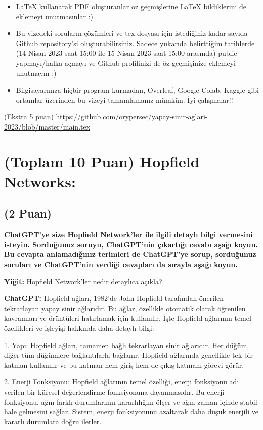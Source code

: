 \documentclass[11pt]{article}
\begin{document}
\begin{itemize}
    \item LaTeX kullanarak PDF oluşturanlar öz geçmişlerine LaTeX bildiklerini de eklemeyi unutmasınlar :)
    \item Bu vizedeki soruların çözümleri ve tex dosyası için istediğiniz kadar sayıda Github repository'si oluşturabilirsiniz. Sadece yukarıda belirttiğim tarihlerde (14 Nisan 2023 saat 15:00 ile 15 Nisan 2023 saat 15:00 arasında) public yapmayı/halka açmayı ve Github profilinizi de öz geçmişinize eklemeyi unutmayın :)
    \item Bilgisayarınıza hiçbir program kurmadan, Overleaf, Google Colab, Kaggle gibi ortamlar üzerinden bu vizeyi tamamlamanız mümkün. İyi çalışmalar!!
\end{itemize}

(Ekstra 5 puan) \url{https://github.com/orypersec/yapay-sinir-aglari-2023/blob/master/main.tex}

\newpage
\section{(Toplam 10 Puan) Hopfield Networks:}

\subsection{(2 Puan)} \textbf{ChatGPT’ye size Hopfield Network’ler ile ilgili detaylı bilgi vermesini isteyin. Sorduğunuz soruyu, ChatGPT'nin çıkartığı cevabı aşağı koyun. Bu cevapta anlamadığınız terimleri de ChatGPT’ye sorup, sorduğunuz soruları ve ChatGPT’nin verdiği cevapları da sırayla aşağı koyun.}

\textbf{Yiğit:} Hopfield Network’ler nedir detaylıca açıkla? 

\textbf{ChatGPT:} Hopfield ağları, 1982'de John Hopfield tarafından önerilen tekrarlayan yapay sinir ağlarıdır. Bu ağlar, özellikle otomatik olarak öğrenilen kavramları ve örüntüleri hatırlamak için kullanılır. İşte Hopfield ağlarının temel özellikleri ve işleyişi hakkında daha detaylı bilgi:

1. Yapı: Hopfield ağları, tamamen bağlı tekrarlayan sinir ağlarıdır. Her düğüm, diğer tüm düğümlere bağlantılarla bağlanır. Hopfield ağlarında genellikle tek bir katman kullanılır ve bu katman hem giriş hem de çıkış katmanı görevi görür.

2. Enerji Fonksiyonu: Hopfield ağlarının temel özelliği, enerji fonksiyonu adı verilen bir küresel değerlendirme fonksiyonuna dayanmasıdır. Bu enerji fonksiyonu, ağın farklı durumlarının kararlılığını ölçer ve ağın zaman içinde stabil hale gelmesini sağlar. Sistem, enerji fonksiyonunu azaltarak daha düşük enerjili ve kararlı durumlara doğru ilerler.
\end{document}
